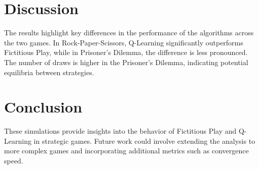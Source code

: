 \documentclass{article}
\begin{document}
\section*{Discussion}
The results highlight key differences in the performance of the algorithms across the two games. In Rock-Paper-Scissors, Q-Learning significantly outperforms Fictitious Play, while in Prisoner's Dilemma, the difference is less pronounced. The number of draws is higher in the Prisoner's Dilemma, indicating potential equilibria between strategies.

\section*{Conclusion}
These simulations provide insights into the behavior of Fictitious Play and Q-Learning in strategic games. Future work could involve extending the analysis to more complex games and incorporating additional metrics such as convergence speed.
\end{document}
